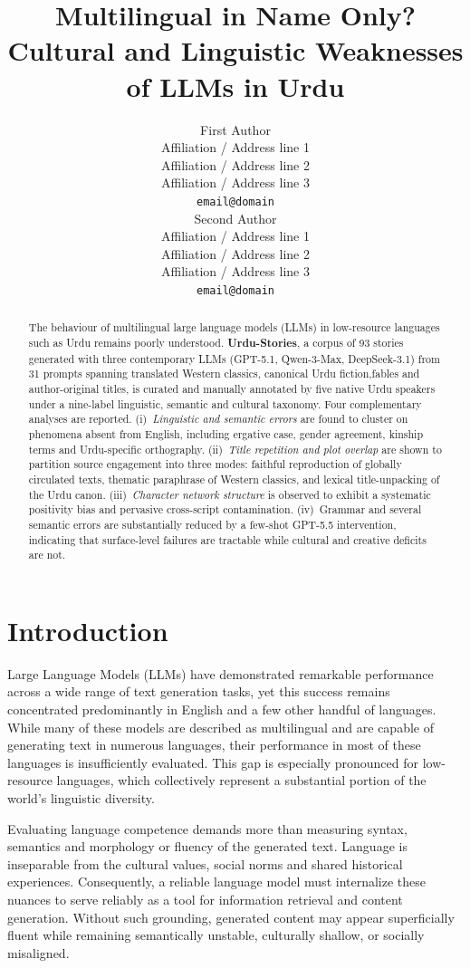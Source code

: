 \documentclass[11pt]{article}
\title{
Multilingual in Name Only? \\ Cultural and Linguistic Weaknesses of LLMs in Urdu}
\author{First Author \\
  Affiliation / Address line 1 \\
  Affiliation / Address line 2 \\
  Affiliation / Address line 3 \\
  \texttt{email@domain} \\\And
  Second Author \\
  Affiliation / Address line 1 \\
  Affiliation / Address line 2 \\
  Affiliation / Address line 3 \\
  \texttt{email@domain} \\}
\begin{document}
\maketitle

\begin{abstract}
The behaviour of multilingual large language models (LLMs) in low-resource languages such as Urdu remains poorly understood. \textbf{Urdu-Stories}, a corpus of 93 stories generated with three contemporary LLMs (GPT-5.1, Qwen-3-Max, DeepSeek-3.1) from 31 prompts spanning translated Western classics, canonical Urdu fiction,fables and author-original titles, is curated and manually annotated by five native Urdu speakers under a nine-label linguistic, semantic and cultural taxonomy. Four complementary analyses are reported. (i)~\textit{Linguistic and semantic errors} are found to cluster on phenomena absent from English, including ergative case, gender agreement, kinship terms and Urdu-specific orthography. (ii)~\textit{Title repetition and plot overlap} are shown to partition source engagement into three modes: faithful reproduction of globally circulated texts, thematic paraphrase of Western classics, and lexical title-unpacking of the Urdu canon. (iii)~\textit{Character network structure} is observed to exhibit a systematic positivity bias and pervasive cross-script contamination. (iv)~Grammar and several semantic errors are substantially reduced by a few-shot GPT-5.5 intervention, indicating that surface-level failures are tractable while cultural and creative deficits are not.
\end{abstract}



\section{Introduction}

Large Language Models (LLMs) have demonstrated remarkable performance across a wide range of text generation tasks, yet this success remains concentrated predominantly in English and a few other handful of languages. While many of these models are described as multilingual and are capable of generating text in numerous languages, their performance in most of these languages is insufficiently evaluated. This gap is especially pronounced for low-resource languages, which collectively represent a substantial portion of the world’s linguistic diversity.

Evaluating language competence demands more than measuring syntax, semantics and morphology or fluency of the generated text. Language is inseparable from the cultural values, social norms and shared historical experiences. Consequently, a reliable language model must internalize these nuances to serve reliably as a tool for information retrieval and content generation. Without such grounding, generated content may appear superficially fluent while remaining semantically unstable, culturally shallow, or socially misaligned.
\end{document}

